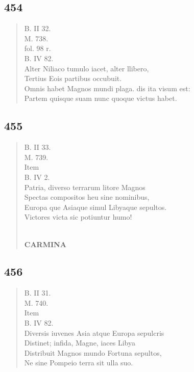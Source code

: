 \documentclass[11pt, a4paper]{report}
\begin{document}
            \subsection*{454}
      \begin{verse}
      B. II 32. \\ M. 738. \\ fol. 98 r. \\ B. IV 82. \\ Alter Niliaco tumulo iacet, alter llibero, \\ Tertius Eois partibus occubuit. \\ Omnis habet Magnos mundi plaga. dis  \lbrack ita visum est: \\ Partem quisque suam nunc quoque victus habet. \\ 
      \end{verse}
  
            \subsection*{455}
      \begin{verse}
      B. II 33. \\ M. 739. \\  \lbrack Item \rbrack  \\ B. IV 2. \\ Patria, diverso terrarum litore Magnos \\ Spectas compositos heu sine nominibus, \\ Europa \lbrack que \rbrack  Asiaque simul Libyaque sepultos. \\ Victores victa sic potiuntur humo! \\ 
        ﻿\pagebreak 
    \begin{center} \textbf{CARMINA} \end{center} \marginpar{[338]} 
      \end{verse}
  
            \subsection*{456}
      \begin{verse}
      B. II 31. \\ M. 740. \\ Item \\ B. IV 82. \\ Diversis iuvenes Asia atque Europa sepulcris \\ Distinet; infida, Magne, iaces Libya \\ Distribuit Magnos mundo Fortuna sepultos, \\ Ne sine Pompeio terra sit ulla suo. \\ 
      \end{verse}
  
\end{document}
